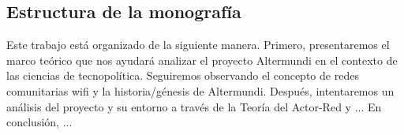 \subsection{Estructura de la monografía}

Este trabajo está organizado de la siguiente manera.
Primero, presentaremos el marco teórico que nos ayudará analizar el proyecto Altermundi en el contexto de las ciencias de tecnopolítica.
Seguiremos observando el concepto de redes comunitarias wifi y la historia/génesis de Altermundi.
Después, intentaremos un análisis del proyecto y su entorno a través de la Teoría del Actor-Red y ...
En conclusión, ...

